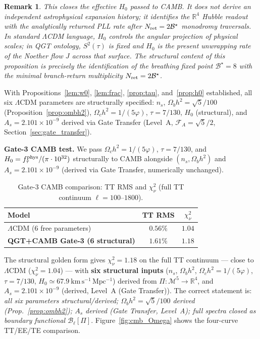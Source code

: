 \documentclass[twocolumn,10pt]{article}
\newcommand{\vp}{\varphi}
\newcommand{\Mfive}{\mathcal{M}^5}
\newcommand{\Rfour}{\mathbb{R}^4}
\newtheorem{remark}[theorem]{Remark}
\begin{document}
\begin{remark}
This closes the effective $H_0$ passed to CAMB. It does not derive an
independent astrophysical expansion history; it identifies the $\Rfour$
Hubble readout with the analytically returned PLL rate after
$N_{\rm ret}=2\mathcal{B}^\star$ monodromy traversals. In standard $\Lambda$CDM
language, $H_0$ controls the angular projection of physical scales;
in QGT ontology, $S^2(\tau)$ is fixed and $H_0$ is the present
unwrapping rate of the Noether flow $J$ across that surface.
The structural content of this proposition is precisely the
identification of the breathing fixed point $\mathcal{B}^\star=8$
with the minimal branch-return multiplicity $N_{\rm ret}=2\mathcal{B}^\star$.
\end{remark}

With Propositions~\ref{lem:w0}, \ref{lem:frac}, \ref{prop:tau},
and~\ref{prop:h0} established, all six $\Lambda$CDM parameters
are structurally specified: $n_s$, $\Omega_bh^2=\sqrt{5}/100$
(Proposition~\ref{prop:ombh2}), $\Omega_ch^2=1/(5\vp)$,
$\tau=7/130$, $H_0$ (structural), and $A_s=2.101\times10^{-9}$
derived via Gate Transfer (Level~A,
$\mathcal{F}_A=\sqrt{5}/2$, Section~\ref{sec:gate_transfer}).

\textbf{Gate-3 CAMB test.}
We pass $\Omega_ch^2=1/(5\vp)$, $\tau=7/130$, and
$H_0=f_\tau^{\rm phys}/(\pi\cdot 10^{32})$ structurally to CAMB
alongside $(n_s,\Omega_bh^2)$ and $A_s=2.101\times10^{-9}$
(derived via Gate Transfer, numerically unchanged).

\begin{table}[t]
\centering
\small\renewcommand{\arraystretch}{1.25}
\caption{Gate-3 CAMB comparison: TT RMS and $\chi^2_\nu$
(full TT continuum $\ell=100$--$1800$).}
\begin{tabular}{lcc}
\toprule
Model & TT RMS & $\chi^2_\nu$ \\
\midrule
$\Lambda$CDM (6 free parameters) & $0.56\%$ & $1.04$ \\
\textbf{QGT+CAMB Gate-3 (6 structural)} & $\mathbf{1.61\%}$ & $\mathbf{1.18}$ \\
\bottomrule
\end{tabular}
\end{table}

The structural golden form gives $\chi^2_\nu=1.18$ on the full
TT continuum — close to $\Lambda$CDM
($\chi^2_\nu=1.04$) — with \textbf{six structural inputs}
($n_s$, $\Omega_bh^2$, $\Omega_ch^2=1/(5\vp)$, $\tau=7/130$,
$H_0\simeq67.9~\mathrm{km\,s^{-1}\,Mpc^{-1}}$) derived from
$\Pi:\Mfive\to\Rfour$, and $A_s=2.101\times10^{-9}$
(derived, Level~A (Gate Transfer)). The correct statement is:
\emph{all six parameters structural/derived; $\Omega_bh^2=\sqrt{5}/100$ derived (Prop.~\ref{prop:ombh2}); $A_s$ derived (Gate Transfer, Level~A); full spectra closed as boundary functional $\mathcal{B}_\ell[\Pi]$}.
Figure~\ref{fig:cmb_Omega} shows the
four-curve TT/EE/TE comparison.
\end{document}
